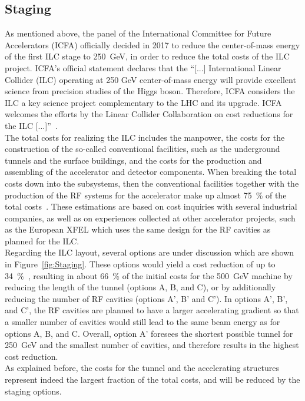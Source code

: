 \subsection{Staging}
As mentioned above, the panel of the International Committee for Future Accelerators (ICFA) officially decided in 2017 to reduce the center-of-mass energy of the first ILC stage to \SI{250}{\GeV}, in order to reduce the total costs of the ILC project.
ICFA's official statement declares that the ``[...] International Linear Collider (ILC) operating at 250 GeV center-of-mass energy will provide excellent science from precision studies of the Higgs boson.
Therefore, ICFA considers the ILC a key science project complementary to the LHC and its upgrade.
ICFA welcomes the efforts by the Linear Collider Collaboration on cost reductions for the ILC [...]''~\cite{ICFA_Statement}.\\
The total costs for realizing the ILC includes the manpower, the costs for the construction of the so-called conventional facilities, such as the underground tunnels and the surface buildings, and the costs for the production and assembling of the accelerator and detector components.
When breaking the total costs down into the subsystems, then the conventional facilities together with the production of the RF systems for the accelerator make up almost \SI{75}{\percent} of the total costs~\cite[p. 20f]{TDR1}.
These estimations are based on cost inquiries with several industrial companies, as well as on experiences collected at other accelerator projects, such as the European XFEL which uses the same design for the RF cavities as planned for the ILC.\\
Regarding the ILC layout, several options are under discussion which are shown in Figure~\ref{fig:Staging}.
These options would yield a cost reduction of up to \SI{34}{\percent}~\cite{Cost_reduction}, resulting in about \SI{66}{\percent} of the initial costs for the \SI{500}{\GeV} machine by reducing the length of the tunnel (options A, B, and C), or by additionally reducing the number of RF cavities (options A', B' and C').
In options A', B', and C', the RF cavities are planned to have a larger accelerating gradient so that a smaller number of cavities would still lead to the same beam energy as for options A, B, and C.
Overall, option A' foresees the shortest possible tunnel for \SI{250}{\GeV} and the smallest number of cavities, and therefore results in the highest cost reduction.\\
As explained before, the costs for the tunnel and the accelerating structures represent indeed the largest fraction of the total costs, and will be reduced by the staging options.
